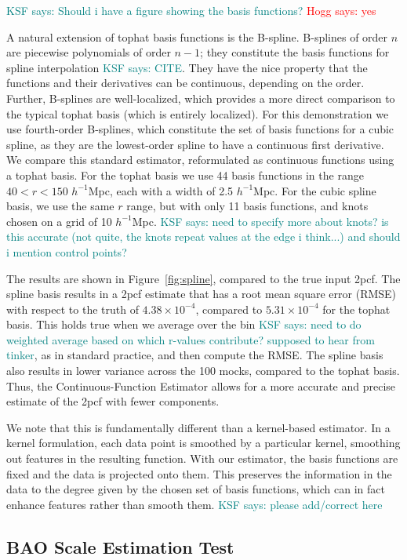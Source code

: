 \documentclass[modern]{aastex62}
\newcommand{\cf}{2pcf\xspace} %
\newcommand{\est}{the Continuous-Function Estimator\xspace}
\newcommand{\hmpc}{$h^{-1}$Mpc}
\newcommand{\KSF}[1]{\textcolor{teal}{KSF says: #1}}
\newcommand{\hogg}[1]{\textcolor{red}{Hogg says: #1}}
\begin{document}
\KSF{Should i have a figure showing the basis functions?} \hogg{yes}

A natural extension of tophat basis functions is the B-spline.
B-splines of order $n$ are piecewise polynomials of order $n-1$; they constitute the basis functions for spline interpolation \KSF{CITE}.
They have the nice property that the functions and their derivatives can be continuous, depending on the order.
Further, B-splines are well-localized, which provides a more direct comparison to the typical tophat basis (which is entirely localized).
For this demonstration we use fourth-order B-splines, which constitute the set of basis functions for a cubic spline, as they are the lowest-order spline to have a continuous first derivative.
We compare this standard estimator, reformulated as continuous functions using a tophat basis.
For the tophat basis we use 44 basis functions in the range $40 < r < 150$ \hmpc, each with a width of 2.5 \hmpc. 
For the cubic spline basis, we use the same $r$ range, but with only 11 basis functions, and knots chosen on a grid of 10 \hmpc.
\KSF{need to specify more about knots? is this accurate (not quite, the knots repeat values at the edge i think...) and should i mention control points?}

The results are shown in Figure~\ref{fig:spline}, compared to the true input \cf.
The spline basis results in a \cf estimate that has a root mean square error (RMSE) with respect to the truth of $4.38 \times 10^{-4}$, compared to $5.31 \times 10^{-4}$ for the tophat basis.
This holds true when we average over the bin \KSF{need to do weighted average based on which r-values contribute? supposed to hear from tinker}, as in standard practice, and then compute the RMSE.
The spline basis also results in lower variance across the 100 mocks, compared to the tophat basis.
Thus, \est allows for a more accurate and precise estimate of the \cf with fewer components.

We note that this is fundamentally different than a kernel-based estimator.
In a kernel formulation, each data point is smoothed by a particular kernel, smoothing out features in the resulting function.
With our estimator, the basis functions are fixed and the data is projected onto them.
This preserves the information in the data to the degree given by the chosen set of basis functions, which can in fact enhance features rather than smooth them.
\KSF{please add/correct here}

\subsection{BAO Scale Estimation Test}
\label{sec:bao}
\end{document}
